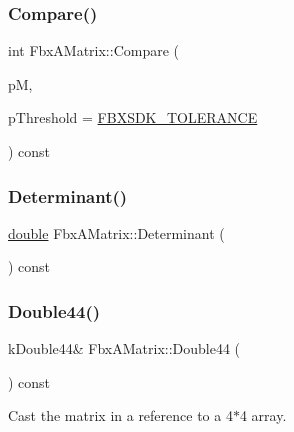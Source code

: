 \subsubsection{\texorpdfstring{Compare()}{Compare()}}
{\footnotesize\ttfamily int Fbx\+A\+Matrix\+::\+Compare (\begin{DoxyParamCaption}\item[{const \hyperlink{class_fbx_a_matrix}{Fbx\+A\+Matrix}}]{pM,  }\item[{const \hyperlink{class_fbx_a_matrix_ad463edbb9fea344643297701f159faa7}{double}}]{p\+Threshold = {\ttfamily \hyperlink{fbxtypes_8h_acf3cd6f208edb42ad9c9abbc1f7feea0}{F\+B\+X\+S\+D\+K\+\_\+\+T\+O\+L\+E\+R\+A\+N\+CE}} }\end{DoxyParamCaption}) const}

\mbox{\label{class_fbx_a_matrix_a4aa7cbe3d389f1d2cbdfbbf2de032192}} 
\subsubsection{\texorpdfstring{Determinant()}{Determinant()}}
{\footnotesize\ttfamily \hyperlink{class_fbx_a_matrix_ad463edbb9fea344643297701f159faa7}{double} Fbx\+A\+Matrix\+::\+Determinant (\begin{DoxyParamCaption}{ }\end{DoxyParamCaption}) const}

\mbox{\label{class_fbx_a_matrix_ab98e9bd947f8db20e14aa9b1d124402a}} 
\subsubsection{\texorpdfstring{Double44()}{Double44()}}
{\footnotesize\ttfamily k\+Double44\& Fbx\+A\+Matrix\+::\+Double44 (\begin{DoxyParamCaption}{ }\end{DoxyParamCaption}) const}



Cast the matrix in a reference to a 4$\ast$4 array. 

\mbox{\label{class_fbx_a_matrix_ac3271d21b23683864a324ad93c860aad}} 
